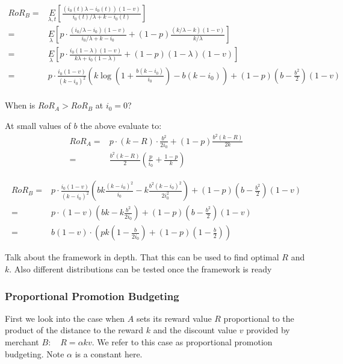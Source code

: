 \begin{align*}
RoR_B =& \underset{\lambda, t}E\left[\frac{(i_0(t)\lambda - i_0(t))(1-v)}{i_0(t)/\lambda + k - i_0(t)}\right]\\
                                     =& \underset{\lambda}E\left[p\cdot\frac{(i_0/\lambda - i_0)(1-v)}{i_0/\lambda + k - i_0} + (1-p)\frac{(k/\lambda - k)(1-v)}{k/\lambda}\right]\\
                                     =& \underset{\lambda}E\left[p\cdot\frac{i_0(1-\lambda)(1-v)}{k\lambda + i_0(1-\lambda)} + (1-p)(1-\lambda)(1-v)\right]\\
                                     =& p\cdot\frac{i_0(1-v)}{(k-i_0)^2}\left(k\log\left(1+\frac{b(k-i_0)}{i_0}\right) - b(k-i_0)\right) + (1-p)(b-\frac{b^2}{2})(1-v)\\
\end{align*}

{\arpit
\begin{theorem}
When is $RoR_A > RoR_B$ at $i_0 = 0$?
\end{theorem}
}

At small values of $b$ the above evaluate to:
\begin{align*}
RoR_A =& p\cdot(k-R)\cdot\frac{b^2}{2i_0} + (1-p)\frac{b^2(k-R)}{2k}\\
                                       =& \frac{b^2(k-R)}{2}\left(\frac{p}{i_0} + \frac{1-p}{k}\right)
\end{align*}

\begin{align*}
RoR_B =& p\cdot\frac{i_0(1-v)}{(k-i_0)^2}\left(bk\frac{(k-i_0)^2}{i_0}- k\frac{b^2(k-i_0)^2}{2i_0^2} \right) + (1-p)(b-\frac{b^2}{2})(1-v)\\
                                     =& p\cdot(1-v)\left(bk- k\frac{b^2}{2i_0}\right) + (1-p)(b-\frac{b^2}{2})(1-v)\\
                                     =& b(1-v)\cdot \left(pk(1-\frac{b}{2i_0}) + (1-p)(1-\frac{b}{2})\right)
\end{align*}

{\arpit Talk about the framework in depth. That this can be used to find optimal $R$ and $k$. Also different distributions can be tested once the framework is ready}

\subsubsection{Proportional Promotion Budgeting}
First we look into the case when $A$ sets its reward value $R$ proportional to the product of the distance to the reward $k$ and the discount value $v$ provided by merchant $B$: \ie~ $R = \alpha k v$.
We refer to this case as proportional promotion budgeting.
Note $\alpha$ is a constant here.

